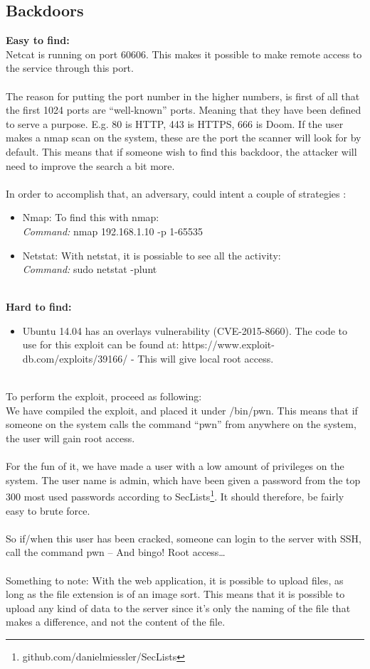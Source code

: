 \documentclass{article}
\begin{document}
\subsection{Backdoors}
\textbf{Easy to find:}\\ 
Netcat is running on port 60606. This makes it possible to make remote access to the service through this port.\\ \\
The reason for putting the port number in the higher numbers, is first of all that the first 1024 ports are “well-known” ports.  Meaning that they have been defined to serve a purpose. E.g. 80 is HTTP, 443 is HTTPS, 666 is Doom. If the user makes a nmap scan on the system, these are the port the scanner will look for by default. This means that if someone wish to find this backdoor, the attacker will need to improve the search a bit more.\\ \\
In order to accomplish that, an adversary, could intent a couple of strategies :
\begin{itemize}
\item Nmap: To find this with nmap:\\
\textit{Command:} nmap 192.168.1.10 -p 1-65535
\item	Netstat: With netstat, it is possiable to see all the activity:\\
\textit{Command:} sudo netstat -plunt
\end{itemize} 
\ \\
\textbf{Hard to find:}
\begin{itemize}
\item Ubuntu 14.04 has an overlays vulnerability (CVE-2015-8660). The code to use for this exploit can be found at: https://www.exploit-db.com/exploits/39166/ - This will give local root access.
\end{itemize}
\ \\
To perform the exploit, proceed as following:\\
We have compiled the exploit, and placed it under /bin/pwn. This means that if someone on the system calls the command “pwn” from anywhere on the system, the user will gain root access. \\ \\
For the fun of it, we have made a user with a low amount of privileges on the system. The user name is admin, which have been given a password from the top 300 most used passwords according to SecLists\footnote{github.com/danielmiessler/SecLists}. It should  therefore, be fairly easy to brute force. \\ \\
So if/when this user has been cracked, someone can login to the server with SSH, call the command pwn – And bingo! Root access…\\ \\
Something to note:
With the web application, it is possible to upload files, as long as the file extension is of an image sort. This means that it is possible to upload any kind of data to the server since it’s only the naming of the file that makes a difference, and not the content of the file. 



\end{document}
